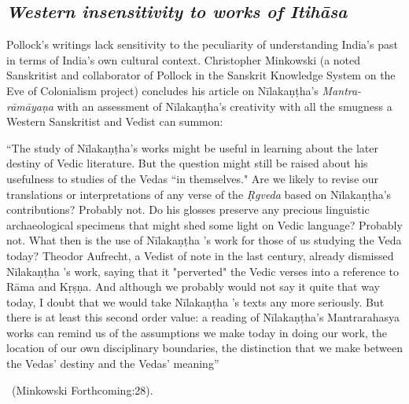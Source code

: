 \subsection*{\textit{Western insensitivity to works of Itihāsa}}

Pollock’s writings lack sensitivity to the peculiarity of understanding India’s past in terms of India’s own cultural context. Christopher Minkowski (a noted Sanskritist and collaborator of Pollock in the Sanskrit Knowledge System on the Eve of Colonialism project) concludes his article on Nīlakaṇṭha’s \textit{Mantra-rāmāyaṇa} with an assessment of Nīlakaṇṭha’s creativity with all the smugness a Western Sanskritist and Vedist can summon:

\begin{myquote}
“The study of Nīlakaṇṭha's works might be useful in learning about the later destiny of Vedic literature. But the question might still be raised about his usefulness to studies of the Vedas “in themselves." Are we likely to revise our translations or interpretations of any verse of the \textit{Ṛgveda} based on Nīlakaṇṭha's contributions? Probably not. Do his glosses preserve any precious linguistic archaeological specimens that might shed some light on Vedic language? Probably not. What then is the use of Nīlakaṇṭha 's work for those of us studying the Veda today? Theodor Aufrecht, a Vedist of note in the last century, already dismissed Nīlakaṇṭha 's work, saying that it "perverted" the Vedic verses into a reference to Rāma and Kṛṣṇa. And although we probably would not say it quite that way today, I doubt that we would take Nīlakaṇṭha 's texts any more seriously. But there is at least this second order value: a reading of Nīlakaṇṭha's Mantrarahasya works can remind us of the assumptions we make today in doing our work, the location of our own disciplinary boundaries, the distinction that we make between the Vedas' destiny and the Vedas' meaning”

~\hfill (Minkowski Forthcoming:28).
\end{myquote}

